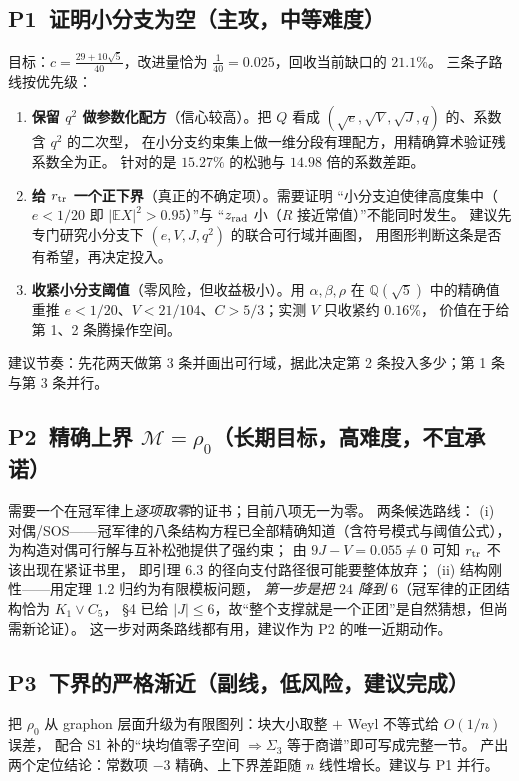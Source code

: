 \documentclass[UTF8,11pt]{ctexart}
\newcommand{\E}{\mathbb{E}}
\newcommand{\M}{\mathcal{M}}
\begin{document}
\subsection*{P1\ 证明小分支为空\quad（主攻，中等难度）}
目标：$c=\frac{29+10\sqrt5}{40}$，改进量恰为 $\frac1{40}=0.025$，回收当前缺口的 $21.1\%$。
三条子路线按优先级：
\begin{enumerate}[leftmargin=2em,itemsep=3pt]
\item \textbf{保留 $q^2$ 做参数化配方}（信心较高）。把 $Q$ 看成
$(\sqrt e,\sqrt V,\sqrt J,q)$ 的、系数含 $q^2$ 的二次型，
在小分支约束集上做一维分段有理配方，用精确算术验证残系数全为正。
针对的是 $15.27\%$ 的松驰与 $14.98$ 倍的系数差距。
\item \textbf{给 $r_{\rm tr}$ 一个正下界}（真正的不确定项）。需要证明
``小分支迫使律高度集中（$e<1/20$ 即 $|\E X|^2>0.95$）''与
``$z_{\rm rad}$ 小（$R$ 接近常值）''不能同时发生。
建议先专门研究小分支下 $(e,V,J,q^2)$ 的联合可行域并画图，
用图形判断这条是否有希望，再决定投入。
\item \textbf{收紧小分支阈值}（零风险，但收益极小）。用 $\alpha,\beta,\rho$ 在 $\mathbb Q(\sqrt5)$ 中的精确值
重推 $e<1/20$、$V<21/104$、$C>5/3$；实测 $V$ 只收紧约 $0.16\%$，
价值在于给第 1、2 条腾操作空间。
\end{enumerate}
建议节奏：先花两天做第 3 条并画出可行域，据此决定第 2 条投入多少；第 1 条与第 3 条并行。

\subsection*{P2\ 精确上界 $\M=\rho_0$\quad（长期目标，高难度，不宜承诺）}
需要一个在冠军律上\emph{逐项取零}的证书；目前八项无一为零。
两条候选路线：
(i) 对偶/SOS——冠军律的八条结构方程已全部精确知道（含符号模式与阈值公式），
为构造对偶可行解与互补松弛提供了强约束；
由 $9J-V=0.055\ne0$ 可知 $r_{\rm tr}$ 不该出现在紧证书里，
即引理 6.3 的径向支付路径很可能要整体放弃；
(ii) 结构刚性——用定理 1.2 归约为有限模板问题，
\emph{第一步是把 $24$ 降到 $6$}（冠军律的正团结构恰为 $K_1\vee C_5$，
\S4 已给 $|J|\le6$，故``整个支撑就是一个正团''是自然猜想，但尚需新论证）。
这一步对两条路线都有用，建议作为 P2 的唯一近期动作。

\subsection*{P3\ 下界的严格渐近\quad（副线，低风险，建议完成）}
把 $\rho_0$ 从 graphon 层面升级为有限图列：块大小取整 $+$ Weyl 不等式给 $O(1/n)$ 误差，
配合 S1 补的``块均值零子空间 $\Rightarrow\Sigma_3$ 等于商谱''即可写成完整一节。
产出两个定位结论：常数项 $-3$ 精确、上下界差距随 $n$ 线性增长。建议与 P1 并行。
\end{document}
